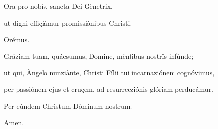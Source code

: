 \documentclass[twoside,10pt]{article}
\begin{document}
{  \bigskip

   Ora pro nobîs, sancta Dei Gènetrix,

  \smallskip

   ut dìgni effiçiámur promissiónibus Christi.

  \bigskip

   Orémus.

  \bigskip

  \noindent Gráziam tuam, quáesumus, Domine, mèntibus nostrîs infùnde;

  ut qui, Àngelo nunziànte, Christi Fílii tui incarnaziónem cognóvimus,

  per passiónem ejus et cruçem, ad resurrecziónis glóriam perducámur.

  Per eùndem Christum Dòminum nostrum.

  \bigskip

   Amen.
}
\end{document}
